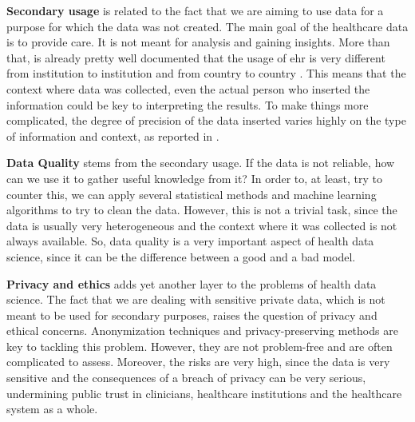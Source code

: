 \textbf{Secondary usage} is related to the fact that we are aiming to use data for a purpose for which the data was not created. The main goal of the healthcare data is to provide care. It is not meant for analysis and gaining insights. More than that, is already pretty well documented that the usage of \ac{ehr} is very different from institution to institution and from country to country \cite{anckerHowElectronicHealth2014,weiskopfMethodsDimensionsElectronic2013a,peekThreeControversiesHealth2018}. This means that the context where data was collected, even the actual person who inserted the information could be key to interpreting the results. To make things more complicated, the degree of precision of the data inserted varies highly on the type of information and context, as reported in \cite{cruz-correiaDataQualityIntegration2009}. 



\textbf{Data Quality} stems from the secondary usage. If the data is not reliable, how can we use it to gather useful knowledge from it? In order to, at least, try to counter this, we can apply several statistical methods and machine learning algorithms to try to clean the data. However, this is not a trivial task, since the data is usually very heterogeneous and the context where it was collected is not always available. So, data quality is a very important aspect of health data science, since it can be the difference between a good and a bad model.



\textbf{Privacy and ethics} adds yet another layer to the problems of health data science. The fact that we are dealing with sensitive private data, which is not meant to be used for secondary purposes, raises the question of privacy and ethical concerns. Anonymization techniques and privacy-preserving methods are key to tackling this problem. However, they are not problem-free and are often complicated to assess. Moreover, the risks are very high, since the data is very sensitive and the consequences of a breach of privacy can be very serious, undermining public trust in clinicians, healthcare institutions and the healthcare system as a whole.


